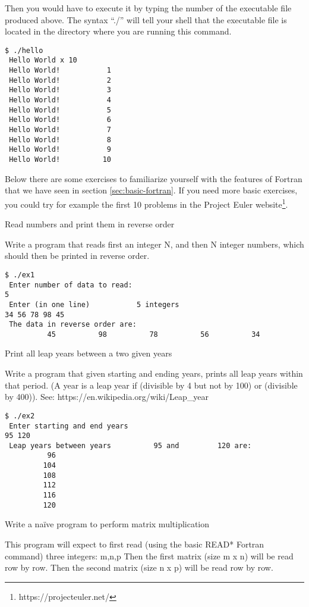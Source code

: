 Then you would have to execute it by typing the number of the executable file
produced above. The syntax ``./'' will tell your shell that the executable file
is located in the directory where you are running this command.

\begin{verbatim}
$ ./hello
 Hello World x 10
 Hello World!           1
 Hello World!           2
 Hello World!           3
 Hello World!           4
 Hello World!           5
 Hello World!           6
 Hello World!           7
 Hello World!           8
 Hello World!           9
 Hello World!          10
\end{verbatim}

Below there are some exercises to familiarize yourself with the features of
Fortran that we have seen in section \ref{sec:basic-fortran}. If you need more
basic exercises, you could try for example the first 10 problems in the Project
Euler website\footnote{https://projecteuler.net/}.

 {Read numbers and print them in reverse order}

Write a program that reads first an integer N, and then N integer numbers, which
should then be printed in reverse order.

\begin{verbatim}
$ ./ex1
 Enter number of data to read:
5
 Enter (in one line)           5 integers
34 56 78 98 45
 The data in reverse order are:
          45          98          78          56          34
\end{verbatim}

 {Print all leap years between a two given years}

Write a program that given starting and ending years, prints all leap years
within that period. (A year is a leap year if (divisible by 4 but not by 100) or
(divisible by 400)). See: https://en.wikipedia.org/wiki/Leap\_year

\begin{verbatim}
$ ./ex2
 Enter starting and end years
95 120
 Leap years between years          95 and         120 are:
          96
         104
         108
         112
         116
         120
\end{verbatim}

 {Write a naïve program to perform matrix multiplication}

This program will expect to first read (using the basic READ* Fortran command) three integers: m,n,p
Then the first matrix (size m x n) will be read row by row.
Then the second matrix (size n x p) will be read row by row.

